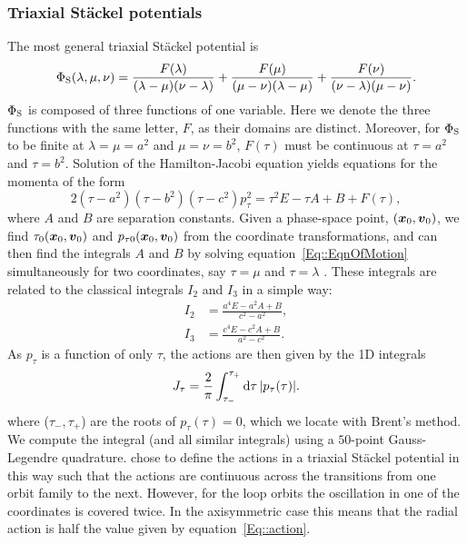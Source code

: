 \documentclass[useAMS,usenatbib,fleqn,a4paper]{mn2e}
\begin{document}
\subsubsection{Triaxial St\"ackel potentials}

The most general triaxial St\"ackel potential is
\begin{equation}
\Phi_{\rm S}(\lambda,\mu,\nu) = \frac{F(\lambda)}{(\lambda-\mu)(\nu-\lambda)}+\frac{F(\mu)}{(\mu-\nu)(\lambda-\mu)}+\frac{F(\nu)}{(\nu-\lambda)(\mu-\nu)}.
\end{equation}
$\Phi_{\rm S}$ is composed of three functions of one variable. Here we denote the
three functions with the same letter, $F$, as their domains are distinct.
Moreover, for $\Phi_{\rm S}$ to be finite at $\lambda=\mu=a^2$ and
$\mu=\nu=b^2$, $F(\tau)$ must be continuous at $\tau=a^2$ and $\tau=b^2$.
Solution of  the Hamilton-Jacobi equation
\citep{deZeeuw1985a} yields equations for the momenta of the form
\begin{equation}
2(\tau-a^2)(\tau-b^2)(\tau-c^2)p_\tau^2=\tau^2 E -\tau A+B + F(\tau),
\label{Eq::EqnOfMotion}
\end{equation}
 where $A$ and $B$ are separation constants.  Given a phase-space
point, $(\vx_0,\vv_0)$, we find $\tau_0(\vx_0,\vv_0)$ and $p_{\tau
0}(\vx_0,\vv_0)$ from  the coordinate transformations, and can then find the
integrals $A$ and $B$ by solving equation~\eqref{Eq::EqnOfMotion} simultaneously
for two coordinates, say $\tau=\mu$ and $\tau=\lambda$ \citep[see][for more details]{deZeeuw1985a}. These integrals are related to
the classical integrals $I_2$ and $I_3$ in a simple way:
\begin{equation}
\begin{split}
I_2&=\frac{a^4 E-a^2 A+B}{c^2-a^2},\\
I_3&=\frac{c^4E-c^2 A+B}{a^2-c^2}.
\end{split}
\end{equation}
As $p_\tau$ is a function of  only $\tau$, the actions are then given by the
1D integrals
\begin{equation}
J_\tau = \frac{2}{\pi}\int_{\tau_-}^{\tau_+} \mathrm{d}\tau\,|p_\tau(\tau)|.
\label{Eq::action}
\end{equation}
where ($\tau_-,\tau_+$) are the roots of $p_\tau(\tau)=0$, which we locate
with Brent's method. We compute the integral (and all similar integrals) using a $50$-point Gauss-Legendre
quadrature. \cite{deZeeuw1985a} chose to define the actions in a triaxial St\"ackel potential in this way such that the actions are continuous across the transitions from one orbit family to the next. However, for the loop orbits the oscillation in one of the coordinates is covered twice. In the axisymmetric case this means that the radial action is half the value given by equation~\eqref{Eq::action}.
\end{document}
